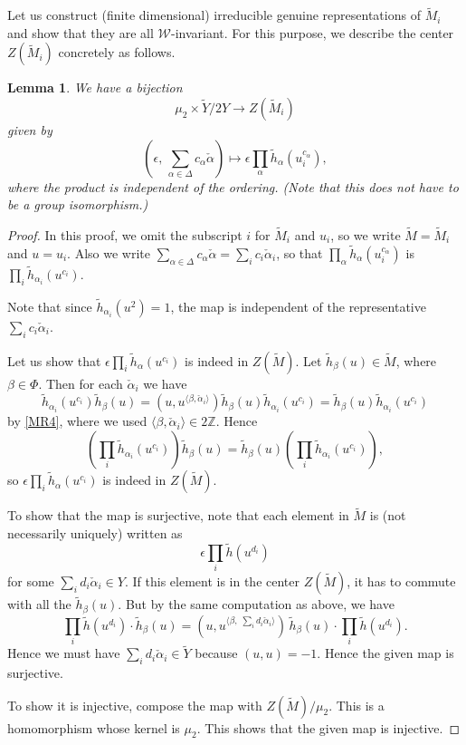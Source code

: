 \documentclass[10pt, letterpaper]{amsart}
\theoremstyle{plain}
\newtheorem{Lem}[equation]{Lemma}
\theoremstyle{definition}
\numberwithin{equation}{section}
\newcommand{\Z}{\mathbb{Z}}
\newcommand{\htt}{\tilde{h}}
\newcommand{\hta}{\tilde{h}_{\alpha}}
\newcommand{\alphac}{{\check{\alpha}}}
\newcommand{\Mt}{\widetilde{M}}
\newcommand{\Yt}{\widetilde{Y}}
\newcommand{\Wcal}{\mathcal{W}}
\newcommand{\la}{\langle}
\newcommand{\ra}{\rangle}
\begin{document}
Let us construct (finite dimensional) irreducible genuine representations of $\Mt_i$ and show that they are all $\Wcal$-invariant. For this purpose, we describe the center $Z(\Mt_i)$ concretely as follows.
\begin{Lem}
We have a bijection
\[
\mu_2\times \Yt\slash 2Y\longrightarrow Z(\Mt_i)
\]
given by
\[
(\epsilon,\, \sum_{\alpha\in\Delta}c_\alpha\alphac)\mapsto \epsilon\prod_{\alpha}\hta(u_i^{c_\alpha}),
\]
where the product is independent of the ordering. (Note that this does not have to be a group isomorphism.)
\end{Lem}
\begin{proof}
In this proof, we omit the subscript $i$ for $\Mt_i$ and $u_i$, so we write $\Mt=\Mt_i$ and $u=u_i$. Also we write $\sum_{\alpha\in\Delta}c_\alpha\alphac=\sum_{i}c_i\alphac_i$, so that $\prod_{\alpha}\hta(u_i^{c_\alpha})$ is $\prod_{i}\htt_{\alpha_i}(u^{c_i})$.

Note that since $\htt_{\alpha_i}(u^2)=1$, the map is independent of the representative $\sum_{i}c_i\alphac_i$.

Let us show that $\epsilon\prod_{i}\hta(u^{c_i})$ is indeed in $Z(\Mt)$. Let $\htt_\beta(u)\in\Mt$, where $\beta\in\Phi$. Then for each $\alphac_i$ we have
\[
\htt_{\alpha_i}(u^{c_i})\htt_\beta(u)=(u, u^{\la \beta, \alphac_i\ra})\htt_\beta(u)\htt_{\alpha_i}(u^{c_i})=\htt_\beta(u)\htt_{\alpha_i}(u^{c_i})
\]
by \eqref{MR4}, where we used $\la \beta, \alphac_i\ra\in 2\Z$. Hence
\[
\left(\prod_{i}\htt_{\alpha_i}(u^{c_i})\right)\htt_\beta(u)=\htt_\beta(u)\left(\prod_{i}\htt_{\alpha_i}(u^{c_i})\right),
\]
so $\epsilon\prod_{i}\hta(u^{c_i})$ is indeed in $Z(\Mt)$.

To show that the map is surjective, note that each element in $\Mt$ is (not necessarily uniquely) written as
\[
\epsilon\prod_i\htt(u^{d_i})
\]
for some $\sum_id_i\alphac_i\in Y$. If this element is in the center $Z(\Mt)$, it has to commute with all the $\htt_\beta(u)$. But by the same computation as above, we have
\[
\prod_i\htt(u^{d_i})\cdot\htt_\beta(u)=(u, u^{\la\beta,\; \sum_id_i\alphac_i\ra})\,\htt_\beta(u) \cdot \prod_i\htt(u^{d_i}). 
\]
Hence we must have $\sum_id_i\alphac_i\in \Yt$ because $(u, u)=-1$. Hence the given map is surjective.

To show it is injective, compose the map with $Z(\Mt)\slash\mu_2$. This is a homomorphism whose kernel is $\mu_2$. This shows that the given map is injective.
\end{proof}
\end{document}
